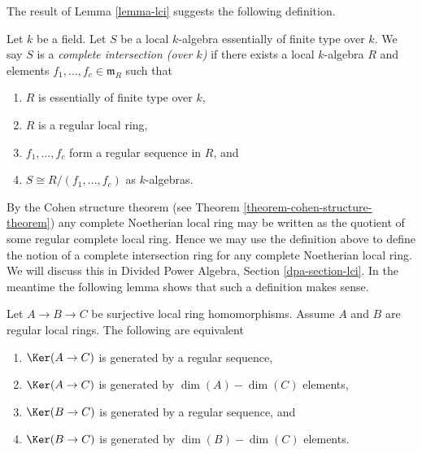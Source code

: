 \noindent
The result of Lemma \ref{lemma-lci} suggests the following definition.

\begin{definition}
\label{definition-lci-local-ring}
Let $k$ be a field. Let $S$ be a local $k$-algebra essentially of finite type
over $k$. We say $S$ is a {\it complete intersection (over $k$)}
if there exists a local $k$-algebra $R$ and elements
$f_1, \ldots, f_c \in \mathfrak m_R$ such that
\begin{enumerate}
\item $R$ is essentially of finite type over $k$,
\item $R$ is a regular local ring,
\item $f_1, \ldots, f_c$ form a regular sequence in $R$, and
\item $S \cong R/(f_1, \ldots, f_c)$ as $k$-algebras.
\end{enumerate}
\end{definition}

\noindent
By the Cohen structure theorem (see
Theorem \ref{theorem-cohen-structure-theorem}) any complete
Noetherian local ring may be written as the quotient of some regular complete
local ring. Hence we may use the definition above to define the notion of
a complete intersection ring for any complete Noetherian local ring.
We will discuss this in
Divided Power Algebra, Section \ref{dpa-section-lci}.
In the meantime the following lemma shows that such a definition makes sense.

\begin{lemma}
\label{lemma-ci-well-defined}
Let $A \to B \to C$ be surjective local ring homomorphisms.
Assume $A$ and $B$ are regular local rings. The following are equivalent
\begin{enumerate}
\item $\Ker(A \to C)$ is generated by a regular sequence,
\item $\Ker(A \to C)$ is generated by $\dim(A) - \dim(C)$ elements,
\item $\Ker(B \to C)$ is generated by a regular sequence, and
\item $\Ker(B \to C)$ is generated by $\dim(B) - \dim(C)$ elements.
\end{enumerate}
\end{lemma}

